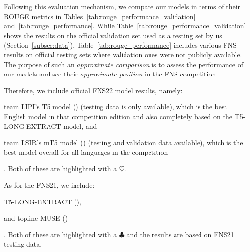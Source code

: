 Following this evaluation mechanism, we compare our models in terms of their ROUGE metrics in Tables~\ref{tab:rouge_performance_validation} and~\ref{tab:rouge_performance}.
While Table~\ref{tab:rouge_performance_validation} shows the results on the official validation set used as a testing set by us (Section~\ref{subsec:data}),
Table~\ref{tab:rouge_performance} includes various FNS results on official testing sets where validation ones were not publicly available.
The purpose of such an \emph{approximate comparison} is to assess the performance of our models and see their \emph{approximate position} in the FNS competition.


Therefore, we include official FNS22 model results, namely:
\begin{enumerate*}
    \item team LIPI's T5 model (\cite{el-haj-etal-2022-financial}) (testing data is only available), which is the best English model
          in that competition edition and also completely based on the T5-LONG-EXTRACT model, and
    \item team LSIR's mT5 model (\cite{foroutan-etal-2022-multilingual}) (testing and validation data available), which is the best model overall for all languages in the competition
\end{enumerate*}. Both of these are highlighted with a $\heartsuit$.

As for the FNS21, we include:
\begin{enumerate*}
    \item T5-LONG-EXTRACT (\cite{orzhenovskii-2021-t5}),
    \item and topline MUSE (\cite{litvak-last-2013-multilingual})
\end{enumerate*}. Both of these are highlighted with a $\clubsuit$ and the results are based on FNS21 testing data.


